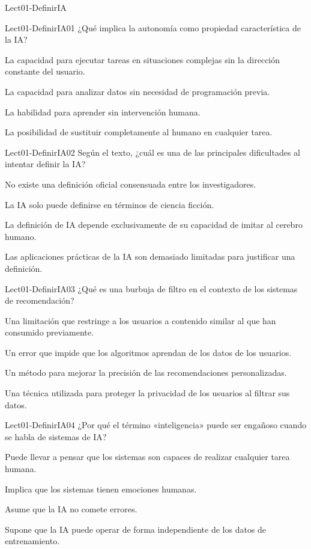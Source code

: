 \documentclass[a4,11pt]{aleph-notas}
\begin{document}
\begin{quiz}{Lect01-DefinirIA}

\begin{multi}[]
{Lect01-DefinirIA01}
¿Qué implica la autonomía como propiedad característica de la IA?
\item* La capacidad para ejecutar tareas en situaciones complejas sin la dirección constante del usuario.
\item La capacidad para analizar datos sin necesidad de programación previa.
\item La habilidad para aprender sin intervención humana.
\item La posibilidad de sustituir completamente al humano en cualquier tarea.
\end{multi}

\begin{multi}[]
{Lect01-DefinirIA02}
Según el texto, ¿cuál es una de las principales dificultades al intentar definir la IA?
\item* No existe una definición oficial consensuada entre los investigadores.
\item La IA solo puede definirse en términos de ciencia ficción.
\item La definición de IA depende exclusivamente de su capacidad de imitar al cerebro humano.
\item Las aplicaciones prácticas de la IA son demasiado limitadas para justificar una definición.
\end{multi}

\begin{multi}[]
{Lect01-DefinirIA03}
¿Qué es una burbuja de filtro en el contexto de los sistemas de recomendación?
\item* Una limitación que restringe a los usuarios a contenido similar al que han consumido previamente.
\item Un error que impide que los algoritmos aprendan de los datos de los usuarios.
\item Un método para mejorar la precisión de las recomendaciones personalizadas.
\item Una técnica utilizada para proteger la privacidad de los usuarios al filtrar sus datos.
\end{multi}

\begin{multi}[]
{Lect01-DefinirIA04}
¿Por qué el término «inteligencia» puede ser engañoso cuando se habla de sistemas de IA?
\item* Puede llevar a pensar que los sistemas son capaces de realizar cualquier tarea humana.
\item Implica que los sistemas tienen emociones humanas.
\item Asume que la IA no comete errores.
\item Supone que la IA puede operar de forma independiente de los datos de entrenamiento.
\end{multi}


\end{quiz}
\end{document}
